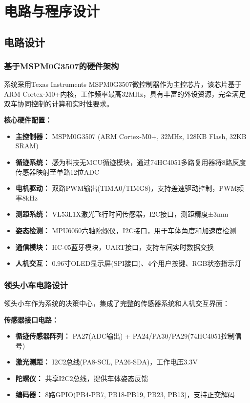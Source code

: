 \documentclass[UTF8]{ctexart}
\begin{document}
\section{电路与程序设计}

\subsection{电路设计}

\subsubsection{基于MSPM0G3507的硬件架构}

系统采用Texas Instruments MSPM0G3507微控制器作为主控芯片，该芯片基于ARM Cortex-M0+内核，工作频率最高32MHz，具有丰富的外设资源，完全满足双车协同控制的计算和实时性要求。

\textbf{核心硬件配置：}
\begin{itemize}
    \item \textbf{主控制器：} MSPM0G3507 (ARM Cortex-M0+, 32MHz, 128KB Flash, 32KB SRAM)
    \item \textbf{循迹系统：} 感为科技无MCU循迹模块，通过74HC4051多路复用器将8路灰度传感器映射至单路12位ADC
    \item \textbf{电机驱动：} 双路PWM输出(TIMA0/TIMG8)，支持差速驱动控制，PWM频率8kHz
    \item \textbf{测距系统：} VL53L1X激光飞行时间传感器，I2C接口，测距精度±3mm
    \item \textbf{姿态检测：} MPU6050六轴陀螺仪，I2C接口，用于车体角度和加速度检测
    \item \textbf{通信模块：} HC-05蓝牙模块，UART接口，支持车间实时数据交换
    \item \textbf{人机交互：} 0.96寸OLED显示屏(SPI接口)、4个用户按键、RGB状态指示灯
\end{itemize}

\subsubsection{领头小车电路设计}

领头小车作为系统的决策中心，集成了完整的传感器系统和人机交互界面：

\textbf{传感器接口电路：}
\begin{itemize}
    \item \textbf{循迹传感器阵列：} PA27(ADC输出) + PA24/PA30/PA29(74HC4051控制信号)
    \item \textbf{激光测距：} I2C2总线(PA8-SCL, PA26-SDA)，工作电压3.3V
    \item \textbf{陀螺仪：} 共享I2C2总线，提供车体姿态反馈
    \item \textbf{编码器：} 8路GPIO(PB4-PB7, PB18-PB19, PB23, PB13)，支持正交解码
\end{itemize}
\end{document}

